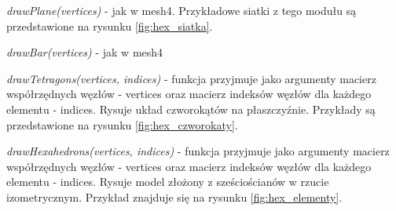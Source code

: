 \vspace {3mm}
\textit{drawPlane(vertices)} - jak w mesh4. Przykładowe siatki z tego modułu są przedstawione na rysunku \ref{fig:hex_siatka}.

\vspace {3mm}
\textit{drawBar(vertices)} - jak w mesh4

\vspace {3mm}
\textit{drawTetragons(vertices, indices)} - funkcja przyjmuje jako argumenty macierz współrzędnych węzłów - vertices oraz macierz indeksów węzłów dla każdego elementu - indices. Rysuje układ czworokątów na płaszczyźnie. Przykłady są przedstawione na rysunku \ref{fig:hex_czworokaty}.

\vspace {3mm}
\textit{drawHexahedrons(vertices, indices)} - funkcja przyjmuje jako argumenty macierz współrzędnych węzłów - vertices oraz macierz indeksów węzłów dla każdego elementu - indices. Rysuje model złożony z sześciościanów w rzucie izometrycznym. Przykład znajduje się na rysunku \ref{fig:hex_elementy}.

